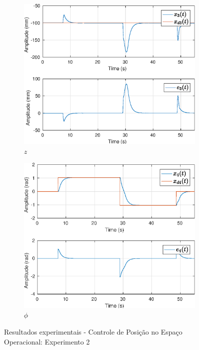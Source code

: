 \begin{figure}[H]
\begin{subfigure}{.5\textwidth}
  \centering
  \includegraphics[width=\linewidth]{./img/position2/x3.eps}
  \caption{$z$}
  \label{fig:oper_space_exp2_x3}
\end{subfigure}%
\begin{subfigure}{.5\textwidth}
  \centering
  \includegraphics[width=\linewidth]{./img/position2/x4.eps}
  \caption{$\phi$}
  \label{fig:pos_exp2_phi}
\end{subfigure}
\caption{Resultados experimentais - Controle de Posição no Espaço Operacional: Experimento 2}
\label{fig:oper_space_exp2}
\end{figure}


